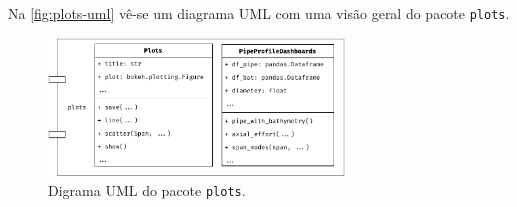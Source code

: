 Na \autoref{fig:plots-uml} vê-se um diagrama UML com uma visão geral do pacote \texttt{plots}.

\begin{figure}[!ht]
    \centering
    \caption{Digrama UML do pacote \texttt{plots}.}\label{fig:plots-uml}
    \includegraphics[width=0.7\textwidth]{imagens/plots-uml}
\end{figure}

